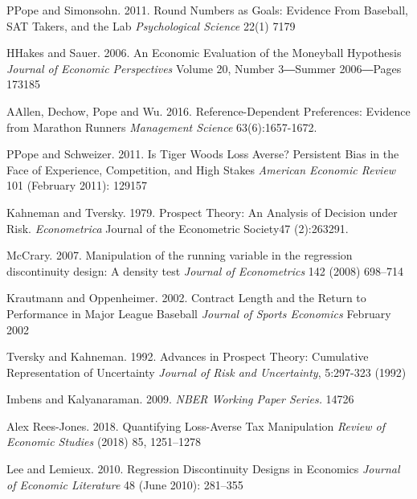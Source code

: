 \documentclass[dvipdfmx, 12pt]{article}
\begin{document}
\begin{thebibliography}{99}
  \bibitem PPope and Simonsohn. 2011.
  Round Numbers as Goals: Evidence From Baseball, SAT Takers, and the Lab
  \textit{Psychological Science} 22(1) 7179

  \bibitem HHakes and Sauer. 2006.
  An Economic Evaluation of the Moneyball Hypothesis
  \textit{Journal of Economic Perspectives} Volume 20, Number 3―Summer 2006―Pages 173185

  \bibitem AAllen, Dechow, Pope and Wu. 2016.
  Reference-Dependent Preferences: Evidence from Marathon Runners \textit{Management Science} 63(6):1657-1672.

  \bibitem PPope and Schweizer. 2011.
  Is Tiger Woods Loss Averse? Persistent Bias in the Face of Experience, Competition, and High Stakes
  \textit{American Economic Review} 101 (February 2011): 129157

  \bibitem{}Kahneman and Tversky. 1979.
  Prospect Theory: An Analysis of Decision under Risk.
  \textit{Econometrica}
  Journal of the Econometric Society47 (2):263291.

  \bibitem{}McCrary. 2007.
  Manipulation of the running variable in the regression discontinuity design: A density test
  \textit{Journal of Econometrics} 142 (2008) 698–714

  \bibitem{}Krautmann and Oppenheimer. 2002.
  Contract Length and the Return to Performance in Major League Baseball
  \textit{Journal of Sports Economics} February 2002

  \bibitem{}Tversky and Kahneman. 1992.
  Advances in Prospect Theory: Cumulative Representation of Uncertainty
  \textit{Journal of Risk and Uncertainty}, 5:297-323 (1992)

  \bibitem{}Imbens and Kalyanaraman. 2009.
  \textit{NBER Working Paper Series.} 14726

  \bibitem{}Alex Rees-Jones. 2018.
  Quantifying Loss-Averse Tax Manipulation
  \textit{Review of Economic Studies} (2018) 85, 1251–1278

  \bibitem{}Lee and Lemieux. 2010.
  Regression Discontinuity Designs in Economics
  \textit{Journal of Economic Literature} 48 (June 2010): 281–355
\end{thebibliography}
\end{document}
